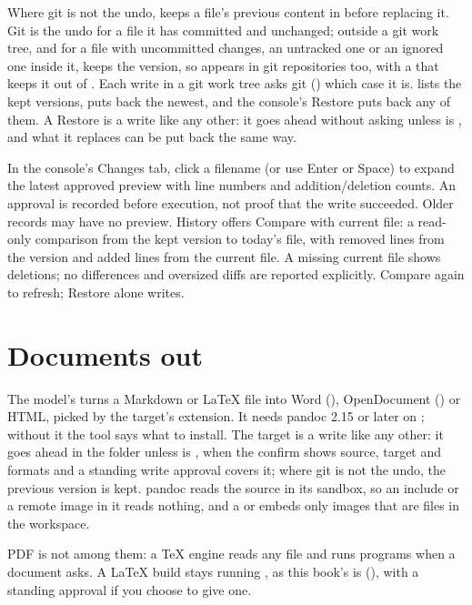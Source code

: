 Where git is not the undo, \nodwyn{} keeps a file's previous content in
 before replacing it. Git is the undo for a file it
has committed and unchanged; outside a git work tree, and for a file with
uncommitted changes, an untracked one or an ignored one inside it,
\nodwyn{} keeps the version, so  appears in git
repositories too, with a  that keeps it out of
. Each write in a git work tree asks git
() which case it is.  lists the
kept versions,  puts back the newest, and the
console's Restore puts back any of them. A Restore is a write like any
other: it goes ahead without asking unless  is
, and what it replaces can be put back the same way.

In the console's Changes tab, click a filename (or use Enter or Space) to
expand the latest approved preview with line numbers and addition/deletion
counts. An approval is recorded before execution, not proof that the write
succeeded. Older records may have no preview. History offers Compare with
current file: a read-only comparison from the kept version to today's file,
with removed lines from the version and added lines from the current file.
A missing current file shows deletions; no differences and oversized diffs
are reported explicitly. Compare again to refresh; Restore alone writes.

\chapter{Documents out}

The model's  turns a Markdown or LaTeX file into Word
(), OpenDocument () or HTML, picked by the target's
extension. It needs pandoc 2.15 or later on ; without it the
tool says what to install. The target is a write like any other: it goes
ahead in the folder unless  is , when
the confirm shows source, target and formats and a standing write approval
covers it; where git is not the undo, the previous version is kept. pandoc
reads the source in its
sandbox, so an include or a remote image in it reads nothing, and a
 or  embeds only images that are files in the
workspace.

PDF is not among them: a TeX engine reads any file and runs programs when a
document asks. A LaTeX build stays  running
, as this book's is (), with a standing
approval if you choose to give one.

